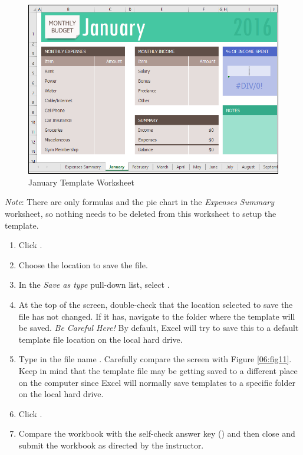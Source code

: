 \begin{figure}[H]
	\centering
	\includegraphics[width=\maxwidth{.95\linewidth}]{gfx/ch06_fig10}
	\caption{January Template Worksheet}
	\label{06:fig10}
\end{figure}

\textit{Note}: There are only formulas and the pie chart in the \textit{Expenses Summary} worksheet, so nothing needs to be deleted from this worksheet to setup the template.

\begin{enumbox}
	\begin{enumerate}
		\item Click .
		\item Choose the location to save the file.
		\item In the \textit{Save as type} pull-down list, select .
		\item At the top of the screen, double-check that the location selected to save the file has not changed. If it has, navigate to the folder where the template will be saved. \textit{Be Careful Here!} By default, Excel will try to save this to a default template file location on the local hard drive.
		\item Type in the file name . Carefully compare the screen with Figure \ref{06:fig11}. Keep in mind that the template file may be getting saved to a different place on the computer since Excel will normally save templates to a specific folder on the local hard drive.
		\item Click .
		\item Compare the workbook with the self-check answer key () and then close and submit the  workbook as directed by the instructor.
	\end{enumerate}
\end{enumbox}
	
